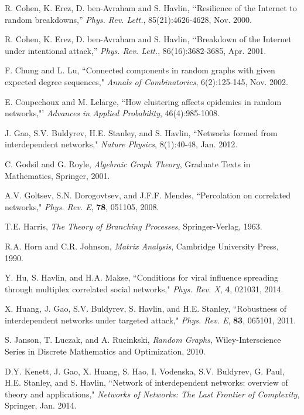 \documentclass[10pt, journal, compsoc]{IEEEtran}
\begin{document}
\begin{thebibliography}{1}
R. Cohen, K. Erez, D. ben-Avraham and S. Havlin, 
\lq \lq Resilience of the {I}nternet to random breakdowns,''
{\em Phys. Rev. Lett.}, 85(21):4626-4628, Nov. 2000. 

R. Cohen, K. Erez, D. ben-Avraham and S. Havlin, 
\lq \lq Breakdown of the {I}nternet under intentional attack,''
{\em Phys. Rev. Lett.}, 86(16):3682-3685, Apr. 2001.

F. Chung and L. Lu, 
``Connected components in random graphs with given expected degree
	sequences,"
{\em Annals of Combinatorics}, 6(2):125-145, Nov. 2002. 

E. Coupechoux and M. Lelarge, 
``How clustering affects epidemics in random networks,"' 
{\em Advances in Applied Probability}, 46(4):985-1008.

J. Gao, S.V. Buldyrev, H.E. Stanley, and S. Havlin, 
``Networks formed from interdependent networks,"
{\em Nature Physics}, 8(1):40-48, Jan. 2012. 

C. Godsil and G. Royle,
{\em Algebraic Graph Theory}, 
Graduate Texts in Mathematics, 
Springer, 2001.

A.V. Goltsev, S.N. Dorogovtsev, and J.F.F. Mendes,
``Percolation on correlated networks,"
{\em Phys. Rev. E}, {\bf 78}, 051105, 2008. 

T.E. Harris, 
{\em The Theory of Branching Processes}, 
Springer-Verlag, 1963. 

R.A. Horn and C.R. Johnson, 
{\em Matrix Analysis}, 
Cambridge University Press, 1990. 

Y. Hu, S. Havlin, and H.A. Makse, 
``Conditions for viral influence spreading through
	multiplex correlated social networks,"
{\em Phys. Rev. X}, {\bf 4}, 021031, 2014. 

X. Huang, J. Gao, S.V. Buldyrev, S. Havlin, and 
	H.E. Stanley, 
``Robustness of interdependent networks under 
	targeted attack,"
{\em Phys. Rev. E}, {\bf 83}, 065101, 2011.

S. Janson, T. Luczak, and A. Rucinkski, 
{\em Random Graphs}, 
Wiley-Interscience Series in Discrete Mathematics
and Optimization, 2010. 

D.Y. Kenett, J. Gao, X. Huang, S. Hao, I. Vodenska, 
S.V. Buldyrev, G. Paul, H.E. Stanley, and S. Havlin, 
``Network of interdependent networks: overview of theory
and applications,"
{\em Networks of Networks: The Last Frontier of Complexity}, 
Springer, Jan. 2014.


\end{thebibliography}
\end{document}
